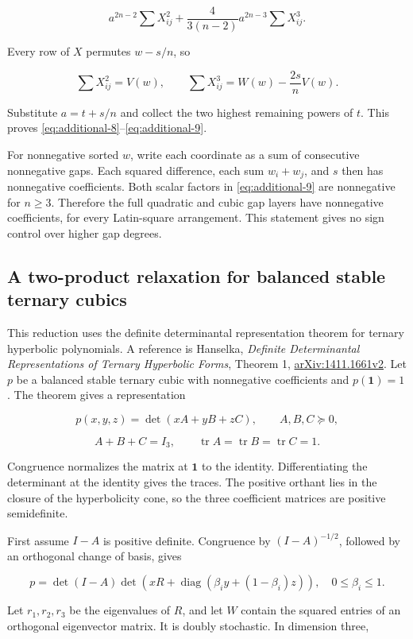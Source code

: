 \[
a^{2n-2}\sum X_{ij}^2
+\frac4{3(n-2)}a^{2n-3}\sum X_{ij}^3.
\]

Every row of \(X\) permutes \(w-s/n\), so

\[
\sum X_{ij}^2=V(w),\qquad
\sum X_{ij}^3=W(w)-\frac{2s}{n}V(w).
\]

Substitute \(a=t+s/n\) and collect the two highest remaining powers of \(t\). This proves \eqref{eq:additional-8}--\eqref{eq:additional-9}.

For nonnegative sorted \(w\), write each coordinate as a sum of consecutive nonnegative gaps. Each squared difference, each sum \(w_i+w_j\), and \(s\) then has nonnegative coefficients. Both scalar factors in \eqref{eq:additional-9} are nonnegative for \(n\ge3\). Therefore the full quadratic and cubic gap layers have nonnegative coefficients, for every Latin-square arrangement. This statement gives no sign control over higher gap degrees.

\subsection{A two-product relaxation for balanced stable ternary cubics}\label{app:additional-24}

This reduction uses the definite determinantal representation theorem for ternary hyperbolic polynomials. A reference is Hanselka, \emph{Definite Determinantal Representations of Ternary Hyperbolic Forms}, Theorem 1, \href{https://arxiv.org/html/1411.1661v2}{arXiv:1411.1661v2}. Let \(p\) be a balanced stable ternary cubic with nonnegative coefficients and \(p(\mathbf1)=1\). The theorem gives a representation

\[
p(x,y,z)=\det(xA+yB+zC),\qquad A,B,C\succeq0,
\]

\[
A+B+C=I_3,\qquad
\operatorname{tr}A=\operatorname{tr}B=\operatorname{tr}C=1.
\]

Congruence normalizes the matrix at \(\mathbf1\) to the identity. Differentiating the determinant at the identity gives the traces. The positive orthant lies in the closure of the hyperbolicity cone, so the three coefficient matrices are positive semidefinite.

First assume \(I-A\) is positive definite. Congruence by \((I-A)^{-1/2}\), followed by an orthogonal change of basis, gives

\[
p=\det(I-A)\det\!\left(xR+
\operatorname{diag}(\beta_i y+(1-\beta_i)z)\right),
\quad0\le\beta_i\le1.
\]

Let \(r_1,r_2,r_3\) be the eigenvalues of \(R\), and let \(W\) contain the squared entries of an orthogonal eigenvector matrix. It is doubly stochastic. In dimension three,

